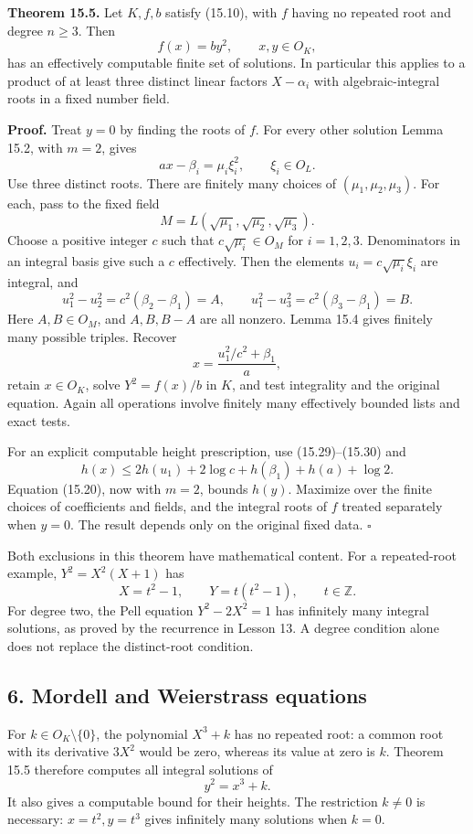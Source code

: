 \documentclass[
  11pt,
  a4paper,
]{article}
\begin{document}
\textbf{Theorem 15.5.} Let \(K,f,b\) satisfy (15.10), with \(f\) having
no repeated root and degree \(n\ge3\). Then \[
f(x)=by^2,\qquad x,y\in O_K,
\tag{15.31}
\] has an effectively computable finite set of solutions. In particular
this applies to a product of at least three distinct linear factors
\(X-\alpha_i\) with algebraic-integral roots in a fixed number field.

\textbf{Proof.} Treat \(y=0\) by finding the roots of \(f\). For every
other solution Lemma 15.2, with \(m=2\), gives \[
ax-\beta_i=\mu_i\xi_i^2,\qquad \xi_i\in O_L.
\tag{15.32}
\] Use three distinct roots. There are finitely many choices of
\((\mu_1,\mu_2,\mu_3)\). For each, pass to the fixed field \[
M=L(\sqrt{\mu_1},\sqrt{\mu_2},\sqrt{\mu_3}).
\tag{15.33}
\] Choose a positive integer \(c\) such that \(c\sqrt{\mu_i}\in O_M\)
for \(i=1,2,3\). Denominators in an integral basis give such a \(c\)
effectively. Then the elements \(u_i=c\sqrt{\mu_i}\xi_i\) are integral,
and \[
u_1^2-u_2^2=c^2(\beta_2-\beta_1)=A,\qquad
u_1^2-u_3^2=c^2(\beta_3-\beta_1)=B.
\tag{15.34}
\] Here \(A,B\in O_M\), and \(A,B,B-A\) are all nonzero. Lemma 15.4
gives finitely many possible triples. Recover \[
x=\frac{u_1^2/c^2+\beta_1}{a},
\tag{15.35}
\] retain \(x\in O_K\), solve \(Y^2=f(x)/b\) in \(K\), and test
integrality and the original equation. Again all operations involve
finitely many effectively bounded lists and exact tests.

For an explicit computable height prescription, use (15.29)--(15.30) and
\[
h(x)\le 2h(u_1)+2\log c+h(\beta_1)+h(a)+\log2.
\tag{15.36}
\] Equation (15.20), now with \(m=2\), bounds \(h(y)\). Maximize over
the finite choices of coefficients and fields, and the integral roots of
\(f\) treated separately when \(y=0\). The result depends only on the
original fixed data. \(\square\)

Both exclusions in this theorem have mathematical content. For a
repeated-root example, \(Y^2=X^2(X+1)\) has \[
X=t^2-1,\qquad Y=t(t^2-1),\qquad t\in\mathbb Z.
\] For degree two, the Pell equation \(Y^2-2X^2=1\) has infinitely many
integral solutions, as proved by the recurrence in Lesson 13. A degree
condition alone does not replace the distinct-root condition.

\subsection{6. Mordell and Weierstrass
equations}\label{mordell-and-weierstrass-equations}

For \(k\in O_K\setminus\{0\}\), the polynomial \(X^3+k\) has no repeated
root: a common root with its derivative \(3X^2\) would be zero, whereas
its value at zero is \(k\). Theorem 15.5 therefore computes all integral
solutions of \[
y^2=x^3+k.
\] It also gives a computable bound for their heights. The restriction
\(k\ne0\) is necessary: \(x=t^2,y=t^3\) gives infinitely many solutions
when \(k=0\).
\end{document}
